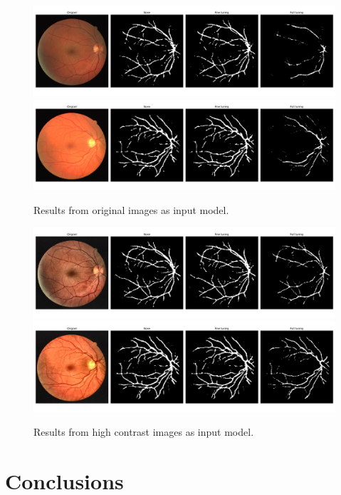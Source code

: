 \begin{frame}
  \begin{figure}[H]
    \includegraphics[width=13cm]{Graphics/normal/04.png}
    \includegraphics[width=13cm]{Graphics/normal/14.png}
    \caption{Results from original images as input model.}
  \end{figure}
\end{frame}

\begin{frame}
  \begin{figure}[H]
    \includegraphics[width=13cm]{Graphics/high_contrast/04.png}
    \includegraphics[width=13cm]{Graphics/high_contrast/14.png}
    \caption{Results from high contrast images as input model.}
  \end{figure}
\end{frame}

\section{Conclusions}

